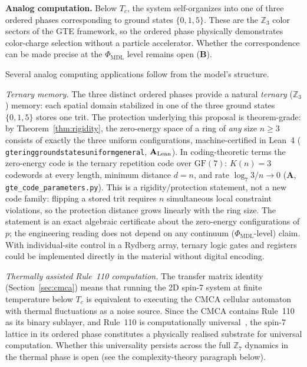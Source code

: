 \documentclass[11pt]{article}
\theoremstyle{remark}
\newcommand{\PHIMDL}{\ensuremath{\Phi_{\mathrm{MDL}}}}
\newcommand{\GF}[1]{\ensuremath{\mathrm{GF}(#1)}}
\newcommand{\lean}[1]{%
  \penalty-100
  \begingroup\def\_{\textunderscore\allowbreak}\texttt{#1}\endgroup}
\newcommand{\CatA}{\textbf{A}}
\newcommand{\CatAL}{\ensuremath{\textbf{A}_{\rm Lean}}}
\newcommand{\CatB}{\textbf{B}}
\begin{document}
\medskip
\noindent\textbf{Analog computation.}
Below $T_c$, the system self-organizes into one of three ordered phases corresponding
to ground states $\{0, 1, 5\}$. These are the $\mathbb{Z}_3$ color sectors of the GTE
framework, so the ordered phase physically demonstrates color-charge selection without
a particle accelerator. Whether the correspondence can be made precise at the
$\PHIMDL{}$ level remains open (\CatB{}).

Several analog computing applications follow from the model's structure.

\noindent\emph{Ternary memory.}
The three distinct ordered phases provide a natural \emph{ternary}
($\mathbb{Z}_3$) memory: each spatial domain stabilized in one of the three
ground states $\{0, 1, 5\}$ stores one trit. The protection underlying this
proposal is theorem-grade: by Theorem~\ref{thm:rigidity}, the zero-energy space
of a ring of \emph{any} size $n \ge 3$ consists of exactly the three uniform
configurations, machine-certified in Lean~4
(\lean{gte\_ring\_ground\_states\_uniform\_general}, \CatAL{}). In
coding-theoretic terms the zero-energy code is the ternary repetition code over
$\GF{7}$: $K(n) = 3$ codewords at every length, minimum distance $d = n$, and
rate $\log_7 3 / n \to 0$ (\CatA{}, \texttt{gte\_code\_parameters.py}). This is
a rigidity/protection statement, not a new code family: flipping a stored trit
requires $n$ simultaneous local constraint violations, so the protection
distance grows linearly with the ring size. The statement is an exact algebraic
certificate about the zero-energy configurations of $p$; the engineering
reading does not depend on any continuum ($\PHIMDL{}$-level) claim. With
individual-site control in a Rydberg array, ternary logic gates and registers
could be implemented directly in the material without digital encoding.

\noindent\emph{Thermally assisted Rule~110 computation.}
The transfer matrix identity (Section~\ref{sec:cmca}) means that running the 2D spin-7
system at finite temperature below $T_c$ is equivalent to executing the CMCA cellular
automaton with thermal fluctuations as a noise source. Since the CMCA contains Rule~110 as
its binary sublayer, and Rule~110 is computationally
universal~\cite{Cook2004,SpivackCompUniversality}, the spin-7 lattice in its ordered phase
constitutes a physically realised substrate for universal computation.
Whether this universality persists across the full $\mathbb{Z}_7$ dynamics in the thermal
phase is open (see the complexity-theory paragraph below).
\end{document}
